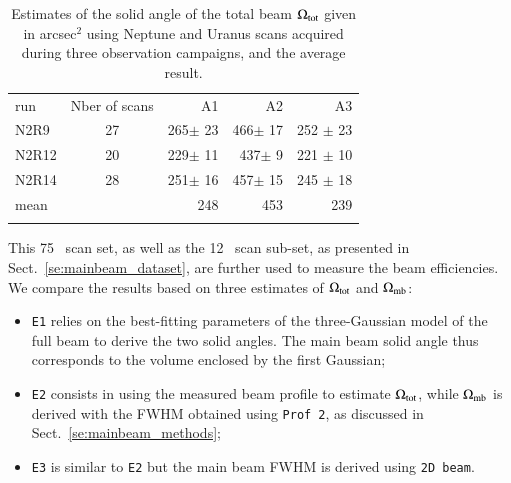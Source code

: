 \begin{table}[!h]
\caption{Estimates of the solid angle of the total beam
  $\Omega_{\rm{tot}}$ given in arcsec$^{2}$ using Neptune and Uranus
  scans acquired during three observation campaigns, and the average
  result.  }
\label{tab:solid}
\centering
\begin{tabular}{l c rrr}
\hline\hline
\noalign{\smallskip}
run  & Nber of scans & %
A1    &    A2   &  A3  \\%
\noalign{\smallskip}
\hline
\noalign{\smallskip}
N2R9    & 27  &  265$\pm$ 23    &  466$\pm$ 17 & 252 $\pm$ 23 \\%
N2R12   & 20  &  229$\pm$ 11    &  437$\pm$  9 & 221 $\pm$ 10 \\%
N2R14   & 28  &  251$\pm$ 16    &  457$\pm$ 15 & 245 $\pm$ 18 \\%
mean    &     &  248            &  453         &  239         \\%
\noalign{\smallskip}
\hline
\end{tabular}
\end{table}


This 75 \bm\ scan set, as well as the 12 \bm\ scan sub-set, as
presented in Sect.~\ref{se:mainbeam_dataset}, are further used to
measure the beam
efficiencies. We compare the results based on three estimates of
$\Omega_{\rm{tot}}$ and $\Omega_{\rm{mb}}$:
\begin{itemize}
  \item{{\tt E1} relies on the best-fitting parameters of the
    three-Gaussian model of the full beam to derive the two solid
    angles. The main beam solid angle thus corresponds to the volume
    enclosed by the first Gaussian;}
  \item{{\tt E2} consists in using the measured beam profile to
    estimate $\Omega_{\rm{tot}}$, while $\Omega_{\rm{mb}}$ is derived with the FWHM obtained using {\tt Prof 2}, as discussed in Sect.~\ref{se:mainbeam_methods};}
  \item{{\tt E3} is similar to {\tt E2} but the main beam FWHM is
    derived using {\tt 2D beam}.}  
\end{itemize}

